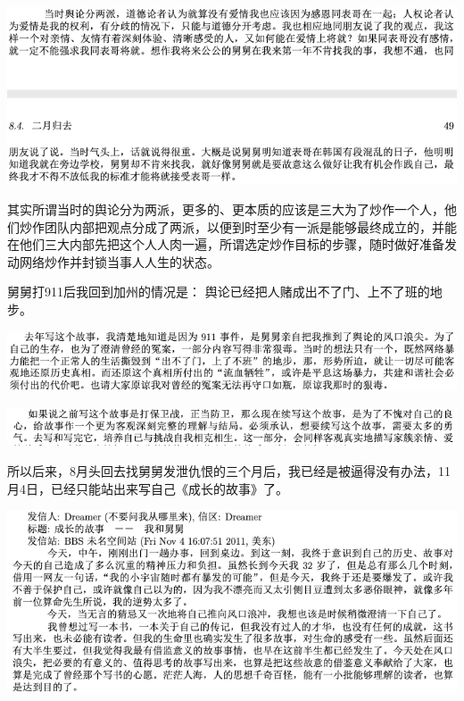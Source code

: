 \documentclass[9pt, b5paper]{article}
\begin{document}
\begin{center}
\includegraphics[width=.9\linewidth]{./pic/p1p49-2.png}
\end{center}

其实所谓当时的舆论分为两派，更多的、更本质的应该是三大为了炒作一个人，他们炒作团队内部把观点分成了两派，以便到时至少有一派是能够最终成立的，并能在他们三大内部先把这个人人肉一遍，所谓选定炒作目标的步骤，随时做好准备发动网络炒作并封锁当事人人生的状态。

舅舅打911后我回到加州的情况是： 舆论已经把人赌成出不了门、上不了班的地步。 

\begin{center}
\includegraphics[width=.9\linewidth]{./pic/p1p75-1.png}
\end{center}

\begin{center}
\includegraphics[width=.9\linewidth]{./pic/p1p75-2.png}
\end{center}

所以后来，8月头回去找舅舅发泄仇恨的三个月后，我已经是被逼得没有办法，11月4日，已经只能站出来写自己《成长的故事》了。

\begin{center}
\includegraphics[width=.9\linewidth]{./pic/p1p9.png}
\end{center}
\end{document}
